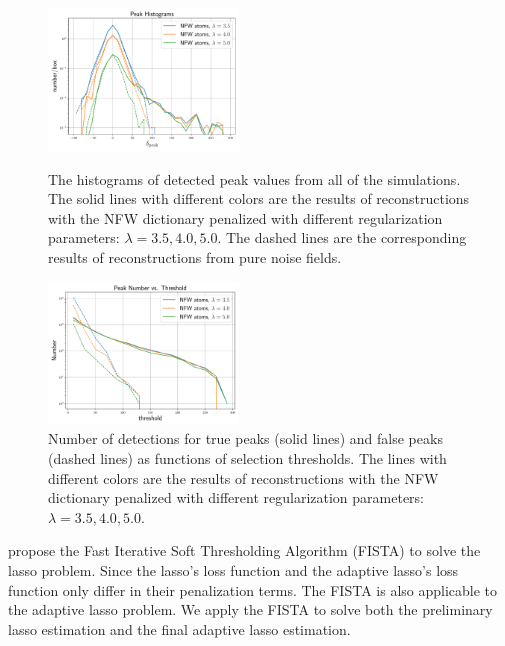 \documentclass[twocolumn]{aastex62}
\begin{document}
\begin{figure}[!t]
 \centering
 \includegraphics[width=0.45\textwidth]{peak_histograms.pdf}
 \caption{The histograms of detected peak values from all of the simulations.
     The solid lines with different colors are the results of reconstructions
     with the NFW dictionary penalized with different regularization
     parameters: $\lambda=3.5,4.0,5.0$. The dashed lines are the corresponding
     results of reconstructions from pure noise fields.
    }\label{fig-peakHist}
 \includegraphics[width=0.45\textwidth]{detfalse_threshold.pdf}
 \caption{Number of detections for true peaks (solid lines) and false
     peaks (dashed lines) as functions of selection thresholds.
     The lines with different colors are the results of reconstructions
     with the NFW dictionary penalized with different regularization
     parameters: $\lambda=3.5,4.0,5.0$.
    }\label{fig-detfalse_threshold}
\end{figure}

\citet{FISTA-Beck2009} propose the Fast Iterative Soft Thresholding Algorithm
(FISTA) to solve the lasso problem.  Since the lasso's loss function and the
adaptive lasso's loss function only differ in their penalization terms. The
FISTA is also applicable to the adaptive lasso problem. We apply the FISTA to
solve both the preliminary lasso estimation and the final adaptive lasso
estimation.
\end{document}
